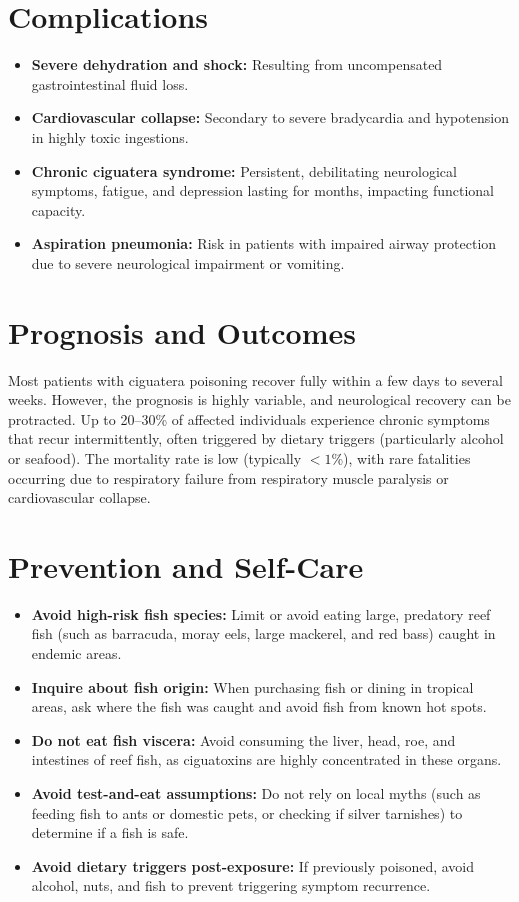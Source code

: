 \section*{Complications}
\begin{itemize}
    \item \textbf{Severe dehydration and shock:} Resulting from uncompensated gastrointestinal fluid loss.
    \item \textbf{Cardiovascular collapse:} Secondary to severe bradycardia and hypotension in highly toxic ingestions.
    \item \textbf{Chronic ciguatera syndrome:} Persistent, debilitating neurological symptoms, fatigue, and depression lasting for months, impacting functional capacity.
    \item \textbf{Aspiration pneumonia:} Risk in patients with impaired airway protection due to severe neurological impairment or vomiting.
\end{itemize}

\section*{Prognosis and Outcomes}
Most patients with ciguatera poisoning recover fully within a few days to several weeks. However, the prognosis is highly variable, and neurological recovery can be protracted. Up to 20--30\% of affected individuals experience chronic symptoms that recur intermittently, often triggered by dietary triggers (particularly alcohol or seafood). The mortality rate is low (typically $<1$\%), with rare fatalities occurring due to respiratory failure from respiratory muscle paralysis or cardiovascular collapse.

\section*{Prevention and Self-Care}
\begin{itemize}
    \item \textbf{Avoid high-risk fish species:} Limit or avoid eating large, predatory reef fish (such as barracuda, moray eels, large mackerel, and red bass) caught in endemic areas.
    \item \textbf{Inquire about fish origin:} When purchasing fish or dining in tropical areas, ask where the fish was caught and avoid fish from known hot spots.
    \item \textbf{Do not eat fish viscera:} Avoid consuming the liver, head, roe, and intestines of reef fish, as ciguatoxins are highly concentrated in these organs.
    \item \textbf{Avoid test-and-eat assumptions:} Do not rely on local myths (such as feeding fish to ants or domestic pets, or checking if silver tarnishes) to determine if a fish is safe.
    \item \textbf{Avoid dietary triggers post-exposure:} If previously poisoned, avoid alcohol, nuts, and fish to prevent triggering symptom recurrence.
\end{itemize}

